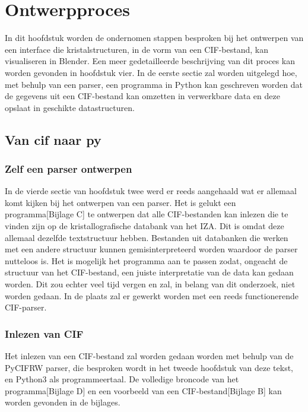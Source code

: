 

\chapter{Ontwerpproces}

In dit hoofdstuk worden de ondernomen stappen besproken bij het ontwerpen van een interface die kristalstructuren, in de vorm van een CIF-bestand, kan visualiseren in Blender. Een meer gedetailleerde beschrijving van dit proces kan worden gevonden in hoofdstuk vier.
In de eerste sectie zal worden uitgelegd hoe, met behulp van een parser, een programma in Python kan geschreven worden dat de gegevens uit een CIF-bestand kan omzetten in verwerkbare data en deze opslaat in geschikte datastructuren.  



\section{Van cif naar py}

\subsection{Zelf een parser ontwerpen}
In de vierde sectie van hoofdstuk twee werd er reeds aangehaald wat er allemaal komt kijken bij het ontwerpen van een parser. Het is gelukt een programma[Bijlage C] te ontwerpen dat alle CIF-bestanden kan inlezen die te vinden zijn op de kristallografische databank van het IZA. Dit is omdat deze allemaal dezelfde textstructuur hebben. Bestanden uit databanken die werken met een andere structuur kunnen gemisinterpreteerd worden waardoor de parser nutteloos is. Het is mogelijk het programma aan te passen zodat, ongeacht de structuur van het CIF-bestand, een juiste interpretatie van de data kan gedaan worden. Dit zou echter veel tijd vergen en zal, in belang van dit onderzoek, niet worden gedaan. In de plaats zal er gewerkt worden met een reeds functionerende CIF-parser.
 

\subsection{Inlezen van CIF}
Het inlezen van een CIF-bestand zal worden gedaan worden met behulp van de PyCIFRW parser, die besproken wordt in het tweede hoofdstuk van deze tekst, en Python3 als programmeertaal. De volledige broncode van het programma[Bijlage D] en een voorbeeld van een CIF-bestand[Bijlage B] kan worden gevonden in de bijlages.

